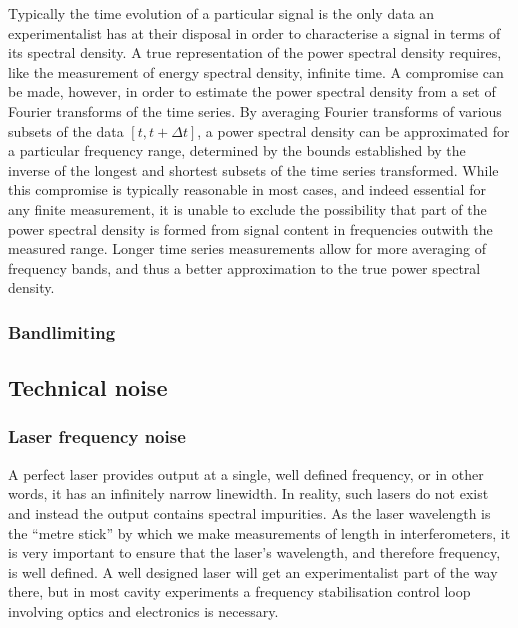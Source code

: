 Typically the time evolution of a particular signal is the only data an experimentalist has at their disposal in order to characterise a signal in terms of its spectral density. A true representation of the power spectral density requires, like the measurement of energy spectral density, infinite time. A compromise can be made, however, in order to estimate the power spectral density from a set of Fourier transforms of the time series. By averaging Fourier transforms of various subsets of the data $\left[ t, t + \Delta t \right]$, a power spectral density can be approximated for a particular frequency range, determined by the bounds established by the inverse of the longest and shortest subsets of the time series transformed. While this compromise is typically reasonable in most cases, and indeed essential for any finite measurement, it is unable to exclude the possibility that part of the power spectral density is formed from signal content in frequencies outwith the measured range. Longer time series measurements allow for more averaging of frequency bands, and thus a better approximation to the true power spectral density.

\subsubsection{Bandlimiting}

\subsection{Technical noise}

\subsubsection{Laser frequency noise}
A perfect laser provides output at a single, well defined frequency, or in other words, it has an infinitely narrow linewidth. In reality, such lasers do not exist and instead the output contains spectral impurities. As the laser wavelength is the ``metre stick'' by which we make measurements of length in interferometers, it is very important to ensure that the laser's wavelength, and therefore frequency, is well defined. A well designed laser will get an experimentalist part of the way there, but in most cavity experiments a frequency stabilisation control loop involving optics and electronics is necessary.

